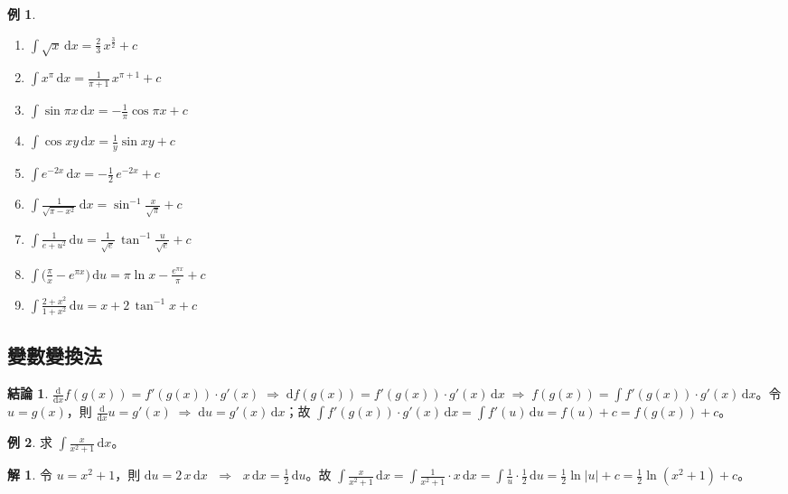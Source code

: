 \documentclass[12pt]{extarticle}
\newcommand{\ds}{\displaystyle}
\newcommand{\ie}{\;\Longrightarrow\;}
\theoremstyle{definition}
\newtheorem*{fact}{結論}
\newtheorem*{ex}{例}
\newtheorem*{sol}{解}
\begin{document}
\begin{ex}
  \setlength{\columnsep}{-7mm}
  \begin{multicols}{3}
    \begin{enumerate}\setlength\itemsep{0em}
      \item $\ds\int\sqrt{x}\,\text{d}x = \frac{2}{3}\,x^{\frac{3}{2}} + c$
      \item $\ds\int x^\pi\,\text{d}x = \frac{1}{\pi + 1}\,x^{\pi + 1} + c$
      \item $\ds\int\sin\pi x\,\text{d}x = -\frac{1}{\pi}\cos\pi x + c$
      \item $\ds\int\cos xy\,\text{d}x = \frac{1}{y}\sin xy + c$
      \item $\ds\int e^{-2x}\,\text{d}x = -\frac{1}{2}\,e^{-2 x} + c$
      \item $\ds\int\frac{1}{\sqrt{\pi - x^2}}\,\text{d}x = \sin^{-1}\frac{x}{\sqrt{\pi}} + c$
      \item $\ds\int\frac{1}{e + u^2}\,\text{d}u = \frac{1}{\sqrt{e}}\,\tan^{-1}\frac{u}{\sqrt{e}} + c$
      \item $\ds\int\big(\frac{\pi}{x} - e^{\pi x}\big)\,\text{d}u = \pi\ln x - \frac{e^{\pi x}}{\pi} + c$
      \item $\ds\int\frac{2 + x^2}{1 + x^2}\,\text{d}u = x + 2\,\tan^{-1}x + c$

    \end{enumerate} 
  \end{multicols}
\end{ex}

\subsection*{變數變換法}

\begin{fact}
  $\ds\frac{\text{d}}{\text{d}x}f(g(x)) = f'(g(x))\cdot g'(x) \ie \text{d}f(g(x)) = f'(g(x))\cdot g'(x)\,\text{d}x \ie f(g(x)) = \int f'(g(x))\cdot g'(x)\,\text{d}x$。令 $\ds u = g(x)$，則 $\ds\frac{\text{d}}{\text{d}x} u = g'(x)\ie \text{d} u = g'(x)\,\text{d}x$；故 $\ds\int f'(g(x))\cdot g'(x)\,\text{d}x = \int f'(u)\,\text{d}u = f(u) + c = f(g(x)) + c$。 
\end{fact}

\begin{ex}
  求 $\ds\int\frac{x}{x^2+1}\,\mathrm{d}x$。
\end{ex}
\begin{sol}
  令 $\ds u = x^2 + 1$，則 $\ds\mathrm{d}u = 2\,x\,\mathrm{d}x$ $\ie$ $\ds x\,\mathrm{d}x=\frac{1}{2}\,\mathrm{d}u$。故 $\ds\int\frac{x}{x^2+1}\,\mathrm{d}x = \int\frac{1}{x^2+1}\cdot x\,\mathrm{d}x = \int\frac{1}{u}\cdot\frac{1}{2}\,\mathrm{d}u = \frac{1}{2}\ln|u| + c = \frac{1}{2}\ln(x^2 + 1) + c$。
\end{sol}
    
\end{document}
